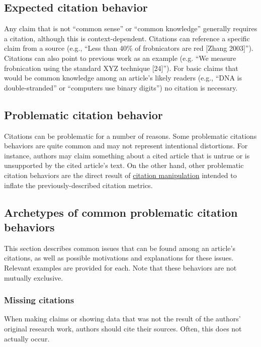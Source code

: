 \documentclass[letterpaper, 12pt]{article}
\begin{document}
\subsection*{Expected citation behavior}

Any claim that is not ``common sense'' or ``common knowledge'' generally requires a citation, although this is context-dependent.
Citations can reference a specific claim from a source (e.g., ``Less than 40\% of frobnicators are red [Zhang 2003]''). 
Citations can also point to previous work as an example (e.g. ``We measure frobnication using the standard XYZ technique [24]'').
For basic claims that would be common knowledge among an article's likely readers (e.g., ``DNA is double-stranded'' or ``computers use binary digits'')
no citation is necessary.

\subsection*{Problematic citation behavior}

Citations can be problematic for a number of reasons. Some problematic citations behaviors are quite common and may not represent intentional distortions. For instance, authors may claim something about a cited article that is untrue or is unsupported by the cited article's text. On the other hand, other problematic citation behaviors are the direct result of \href{https://doi.org/10.24318/cope.2019.3.1}{citation manipulation} intended to inflate the previously-described citation metrics.

\subsection*{Archetypes of common problematic citation behaviors}

This section describes common issues that can be found among an article's citations, as well as possible motivations and explanations for these issues. Relevant examples are provided for each. Note that these behaviors are not mutually exclusive.

\subsubsection*{Missing citations}

When making claims or showing data that was not the result of the authors' original research work, authors should cite their sources. Often, this does not actually occur.
\end{document}
